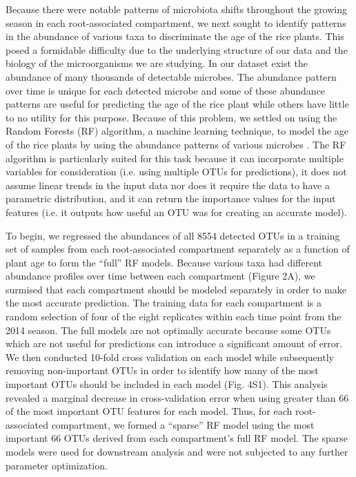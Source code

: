 Because there were notable patterns of microbiota shifts throughout the growing season in each root-associated compartment, we next sought to identify patterns in the abundance of various taxa to discriminate the age of the rice plants. This posed a formidable difficulty due to the underlying structure of our data and the biology of the microorganisms we are studying. In our dataset exist the abundance of many thousands of detectable microbes. The abundance pattern over time is unique for each detected microbe and some of these abundance patterns are useful for predicting the age of the rice plant while others have little to no utility for this purpose. Because of this problem, we settled on using the Random Forests (RF) algorithm, a machine learning technique, to model the age of the rice plants by using the abundance patterns of various microbes \cite{Breiman2001}. The RF algorithm is particularly suited for this task because it can incorporate multiple variables for consideration (i.e. using multiple OTUs for predictions), it does not assume linear trends in the input data nor does it require the data to have a parametric distribution, and it can return the importance values for the input features (i.e. it outputs how useful an OTU was for creating an accurate model). 

To begin, we regressed the abundances of all 8554 detected OTUs in a training set of samples from each root-associated compartment separately as a function of plant age to form the ``full'' RF models. Because various taxa had different abundance profiles over time between each compartment (Figure 2A), we surmised that each compartment should be modeled separately in order to make the most accurate prediction. The training data for each compartment is a random selection of four of the eight replicates within each time point from the 2014 season. The full models are not optimally accurate because some OTUs which are not useful for predictions can introduce a significant amount of error. We then conducted 10-fold cross validation on each model while subsequently removing non-important OTUs in order to identify how many of the most important OTUs should be included in each model (Fig. 4S1). This analysis revealed a marginal decrease in cross-validation error when using greater than 66 of the most important OTU features for each model. Thus, for each root-associated compartment, we formed a ``sparse'' RF model using the most important 66 OTUs derived from each compartment's full RF model. The sparse models were used for downstream analysis and were not subjected to any further parameter optimization.

